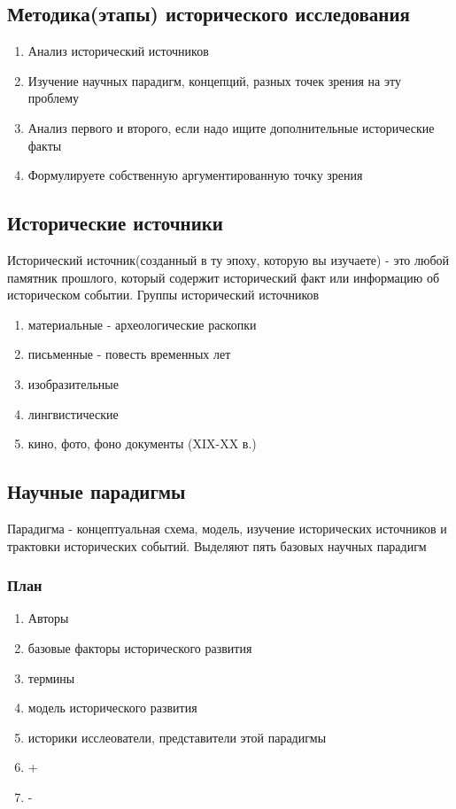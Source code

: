 \documentclass[a4paper]{article}
\begin{document}
\subsection{Методика(этапы) исторического исследования}

\begin{enumerate}
\item Анализ исторический источников
\item Изучение научных парадигм, концепций, разных точек зрения на эту проблему
\item Анализ первого и второго, если надо ищите дополнительные исторические факты
\item Формулируете собственную аргументированную точку зрения
\end{enumerate}

\subsection{Исторические источники}
Исторический источник(созданный в ту эпоху, которую вы изучаете) - это любой памятник прошлого, который содержит исторический факт или информацию об историческом событии.
Группы исторический источников

\begin{enumerate}
\item материальные - археологические раскопки
\item письменные - повесть временных лет
\item изобразительные
\item лингвистические
\item кино, фото, фоно документы (XIX-XX в.)
\end{enumerate}

\subsection{Научные парадигмы}
Парадигма - концептуальная схема, модель, изучение исторических источников и трактовки исторических событий.
Выделяют пять базовых научных парадигм

\subsubsection{План}
\begin{enumerate}
\item Авторы
\item базовые факторы исторического развития
\item термины
\item модель исторического развития
\item историки исслеователи, представители этой парадигмы
\item +
\item -

\end{enumerate}
\end{document}
